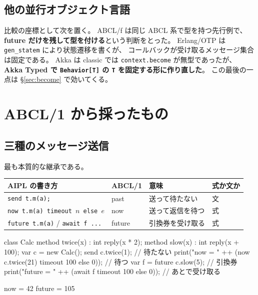 \documentclass[11pt,a4paper]{ltjsarticle}
\theoremstyle{definition}
\theoremstyle{remark}
\begin{document}
\subsection{他の並行オブジェクト言語}

比較の座標として次を置く。
ABCL/f は同じ ABCL 系で型を持つ先行例で、
\textbf{future だけを残して型を付ける}という判断をとった。
Erlang/OTP は \texttt{gen\_statem} により状態遷移を書くが、
コールバックが受け取るメッセージ集合は固定である。
Akka は classic では \texttt{context.become} が無型であったが、
\textbf{Akka Typed で \texttt{Behavior[T]} の \texttt{T} を固定する形に作り直した}。
この最後の一点は \S\ref{sec:become} で効いてくる。

\section{ABCL/1 から採ったもの}
\label{sec:abcl-take}

\subsection{三種のメッセージ送信}

最も本質的な継承である。

\begin{center}
\begin{tabular}{llll}
\toprule
AIPL の書き方 & ABCL/1 & 意味 & 式か文か \\
\midrule
\texttt{send t.m(a);}                          & past   & 送って待たない & 文 \\
\texttt{now t.m(a) timeout $n$ else $e$}       & now    & 送って返信を待つ & 式 \\
\texttt{future t.m(a)} / \texttt{await f ...}  & future & 引換券を受け取る & 式 \\
\bottomrule
\end{tabular}
\end{center}

\begin{aipl}
class Calc {
  method twice(x) : int { reply(x * 2); }
  method slow(x)  : int { reply(x + 100); }
}
var c = new Calc();
send c.twice(1);                                            // 待たない
print("now    = " ++ (now c.twice(21) timeout 100 else 0)); // 待つ
var f = future c.slow(5);                                   // 引換券
print("future = " ++ (await f timeout 100 else 0));         // あとで受け取る
\end{aipl}
\begin{term}
now    = 42
future = 105
\end{term}
\end{document}
